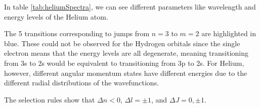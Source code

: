 In table \ref{tab:heliumSpectra}, we can see different parameters like wavelength and energy levels of the Helium atom.

The 5 transitions corresponding to jumps from $n = 3$ to $m = 2$ are highlighted in {\colorbox{blue!25} {blue}}. These could not be observed for the Hydrogen orbitals since the single electron means that the energy levels are all degenerate, meaning transitioning from 3s to 2s would be equivalent to transitioning from 3p to 2s. For Helium, however, different angular momentum states have different energies due to the different radial distributions of the wavefunctions.

The selection rules show that $\Delta n < 0$,  $\Delta l = \pm 1$, and $\Delta J = 0, \pm 1$. 
